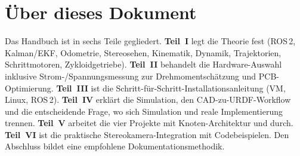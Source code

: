 
\chapter*{Über dieses Dokument}

\begin{infobox}[title=Wie dieses Dokument zu lesen ist]
Das Handbuch ist in sechs Teile gegliedert.
\textbf{Teil~I} legt die Theorie fest (ROS\,2, Kalman/EKF, Odometrie, Stereosehen,
Kinematik, Dynamik, Trajektorien, Schrittmotoren, Zykloidgetriebe).
\textbf{Teil~II} behandelt die Hardware-Auswahl inklusive Strom-/Spannungsmessung
zur Drehmomentschätzung und PCB-Optimierung.
\textbf{Teil~III} ist die Schritt-für-Schritt-Installationsanleitung (VM, Linux,
ROS\,2).
\textbf{Teil~IV} erklärt die Simulation, den CAD-zu-URDF-Workflow und die
entscheidende Frage, wo sich Simulation und reale Implementierung trennen.
\textbf{Teil~V} arbeitet die vier Projekte mit Knoten-Architektur und
 durch.
\textbf{Teil~VI} ist die praktische Stereokamera-Integration mit Codebeispielen.
Den Abschluss bildet eine empfohlene Dokumentationsmethodik.
\end{infobox}

